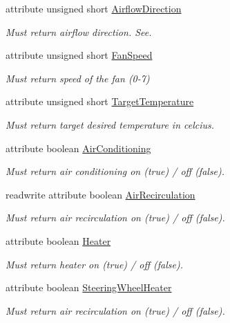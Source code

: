 \begin{DoxyCompactItemize}
\item 
attribute unsigned short \hyperlink{interfaceVehicle_1_1HVAC_a531a6a5dd011770471794dccd168b420}{Airflow\-Direction}
\begin{DoxyCompactList}\small\item\em Must return airflow direction. See. \end{DoxyCompactList}\item 
attribute unsigned short \hyperlink{interfaceVehicle_1_1HVAC_a3394da3cefd51a29e34de5530cd70e70}{Fan\-Speed}
\begin{DoxyCompactList}\small\item\em Must return speed of the fan (0-\/7) \end{DoxyCompactList}\item 
attribute unsigned short \hyperlink{interfaceVehicle_1_1HVAC_a8bf4808d406dc7470fc7eb1828595083}{Target\-Temperature}
\begin{DoxyCompactList}\small\item\em Must return target desired temperature in celcius. \end{DoxyCompactList}\item 
attribute boolean \hyperlink{interfaceVehicle_1_1HVAC_aa5e6696f4580bda42f447695ec282a76}{Air\-Conditioning}
\begin{DoxyCompactList}\small\item\em Must return air conditioning on (true) / off (false). \end{DoxyCompactList}\item 
readwrite attribute boolean \hyperlink{interfaceVehicle_1_1HVAC_a3d685910812578b01c0187f0e1ed03c0}{Air\-Recirculation}
\begin{DoxyCompactList}\small\item\em Must return air recirculation on (true) / off (false). \end{DoxyCompactList}\item 
attribute boolean \hyperlink{interfaceVehicle_1_1HVAC_a18300202ba83eb675c6a4c4c40267af1}{Heater}
\begin{DoxyCompactList}\small\item\em Must return heater on (true) / off (false). \end{DoxyCompactList}\item 
attribute boolean \hyperlink{interfaceVehicle_1_1HVAC_a8142d0336d5e8e6366683514d72a30b6}{Steering\-Wheel\-Heater}
\begin{DoxyCompactList}\small\item\em Must return air recirculation on (true) / off (false). \end{DoxyCompactList}\item 

\end{DoxyCompactItemize}
